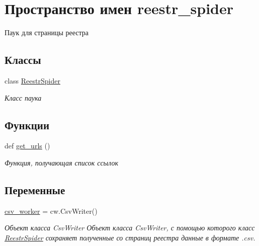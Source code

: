 \hypertarget{namespacereestr__spider}{}\section{Пространство имен reestr\+\_\+spider}
\label{namespacereestr__spider}


Паук для страницы реестра  


\subsection*{Классы}
\begin{DoxyCompactItemize}
\item 
class \hyperlink{classreestr__spider_1_1ReestrSpider}{Reestr\+Spider}
\begin{DoxyCompactList}\small\item\em Класс паука \end{DoxyCompactList}\end{DoxyCompactItemize}
\subsection*{Функции}
\begin{DoxyCompactItemize}
\item 
def \hyperlink{namespacereestr__spider_a3ea2fa58027d32fc4f77d612777789fe}{get\+\_\+urls} ()
\begin{DoxyCompactList}\small\item\em Функция, получающая список ссылок \end{DoxyCompactList}\end{DoxyCompactItemize}
\subsection*{Переменные}
\begin{DoxyCompactItemize}
\item 
\mbox{\label{namespacereestr__spider_a91a73e9f55aafc7333ccec0b50381179}} 
\hyperlink{namespacereestr__spider_a91a73e9f55aafc7333ccec0b50381179}{csv\+\_\+worker} = cw.\+Csv\+Writer()
\begin{DoxyCompactList}\small\item\em Объект класса Csv\+Writer Объект класса Csv\+Writer, с помощью которого класс \hyperlink{classreestr__spider_1_1ReestrSpider}{Reestr\+Spider} сохраняет полученные со страниц реестра данные в формате .csv. \end{DoxyCompactList}\end{DoxyCompactItemize}


